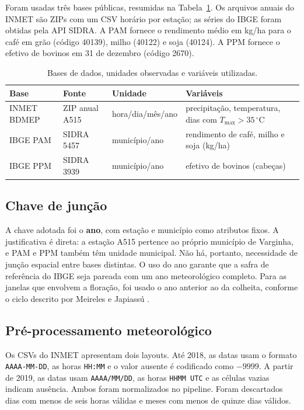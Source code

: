 \documentclass{RBCA}
\begin{document}
Foram usadas tr\^es bases p\'ublicas, resumidas na Tabela~\ref{tab:bases}. Os arquivos anuais do INMET s\~ao ZIPs com um CSV hor\'ario por esta\c{c}\~ao; as s\'eries do IBGE foram obtidas pela API SIDRA. A PAM fornece o rendimento m\'edio em kg/ha para o caf\'e em gr\~ao (c\'odigo 40139), milho (40122) e soja (40124). A PPM fornece o efetivo de bovinos em 31 de dezembro (c\'odigo 2670).

\begin{table}[ht]
\begin{center}
\caption{Bases de dados, unidades observadas e vari\'aveis utilizadas.}
\label{tab:bases}
\begin{tabular}{llll}
\hline
Base & Fonte & Unidade & Vari\'aveis \\
\hline
INMET BDMEP & ZIP anual A515 & hora/dia/m\^es/ano & precipita\c{c}\~ao, temperatura, dias com $T_{\max}>35\,^\circ$C \\
IBGE PAM & SIDRA 5457 & munic\'ipio/ano & rendimento de caf\'e, milho e soja (kg/ha) \\
IBGE PPM & SIDRA 3939 & munic\'ipio/ano & efetivo de bovinos (cabe\c{c}as) \\
\hline
\end{tabular}
\end{center}
\end{table}

\subsection{Chave de jun\c{c}\~ao}

A chave adotada foi o \textbf{ano}, com esta\c{c}\~ao e munic\'ipio como atributos fixos. A justificativa \'e direta: a esta\c{c}\~ao A515 pertence ao pr\'oprio munic\'ipio de Varginha, e PAM e PPM tamb\'em t\^em unidade municipal. N\~ao h\'a, portanto, necessidade de jun\c{c}\~ao espacial entre bases distintas. O uso do ano garante que a safra de refer\^encia do IBGE seja pareada com um ano meteorol\'ogico completo. Para as janelas que envolvem a flora\c{c}\~ao, foi usado o ano anterior ao da colheita, conforme o ciclo descrito por Meireles e Japiass\'u \cite{meireles2009}.

\subsection{Pr\'e-processamento meteorol\'ogico}

Os CSVs do INMET apresentam dois layouts. At\'e 2018, as datas usam o formato \texttt{AAAA-MM-DD}, as horas \texttt{HH:MM} e o valor ausente \'e codificado como $-9999$. A partir de 2019, as datas usam \texttt{AAAA/MM/DD}, as horas \texttt{HHMM UTC} e as c{\'e}lulas vazias indicam aus\^encia. Ambos foram normalizados no pipeline. Foram descartados dias com menos de seis horas v\'alidas e meses com menos de quinze dias v\'alidos.
\end{document}
